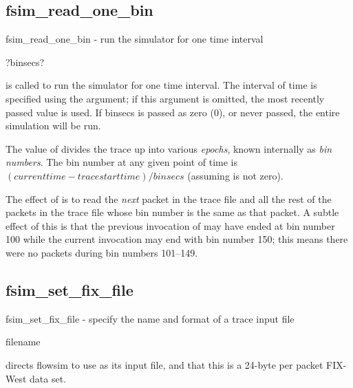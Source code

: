 \documentclass{article}
\begin{document}
\subsection{fsim\_read\_one\_bin}
\begin{description}

\NAME fsim\_read\_one\_bin - run the simulator for one time interval

\SYNOPSIS {} ?binsecs?

\DESCRIPTION

 is called to run the simulator for one time
interval.  The interval of time is specified using the 
argument; if this argument is omitted, the most recently passed value
is used.  If binsecs is passed as zero (0), or never passed, the entire
simulation will be run.

The value of  divides the trace up into various
\emph{epochs}, known internally as \emph{bin numbers}.  The bin number
at any given point of time is $(currenttime-tracestarttime)/binsecs$
(assuming  is not zero).

The effect of  is to read the \emph{next}
packet in the trace file and all the rest of the packets in the trace
file whose bin number is the same as that packet.  A subtle effect of
this is that the previous invocation of  may
have ended at bin number 100 while the current invocation may end with
bin number 150; this means there were no packets during bin numbers
101--149.

\end{description}

\subsection{fsim\_set\_fix\_file}

\begin{description}
\NAME fsim\_set\_fix\_file - specify the name and format of a trace
input file

\SYNOPSIS {} filename

\DESCRIPTION

 directs flowsim to use  as
its input file, and that this is a 24-byte per packet FIX-West data
set.

\SEEALSO


\end{description}
\end{document}
